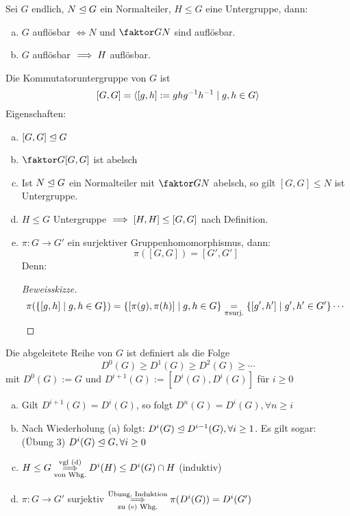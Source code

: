 \documentclass[a4paper]{report}
\begin{document}
\begin{prop}[übung]
  Sei $G$ endlich, $N \trianglelefteq G$ ein Normalteiler, $H \le G$ eine Untergruppe, dann:
  \begin{enumerate}[(a)]
    \item $G$ auflösbar $\iff N$ und $\fak GN$ sind auflösbar.
    \item $G$ auflösbar $\implies H$ auflösbar.
  \end{enumerate}
\begin{whg*}
  Die Kommutatoruntergruppe von $G$ ist
  \[[G,G] = \langle[g, h] := ghg^{-1}h^{-1}\mid g, h \in G\rangle\]
  Eigenschaften:
  \begin{enumerate} [(a)]
    \item $[G, G] \trianglelefteq G$
    \item $\fak G{[G,G]}$ ist abelsch
    \item Ist $N \trianglelefteq G$ ein Normalteiler mit $\fak GN$ abelsch, so gilt $[G, G] \le N$ ist Untergruppe.
    \item $H \le G$ Untergruppe $\implies [H, H] \le [G, G]$ nach Definition.
    \item $\pi : G \to G'$ ein surjektiver Gruppenhomomorphismus, dann: \[\pi([G, G]) = [G', G']\]
          Denn: \begin{proof}[Beweisskizze]
           \[\pi(\{[g, h] \mid g, h \in G\}) = \{[\pi(g), \pi(h)] \mid g, h \in G\} \underset{\pi \text{surj.}} = \{[g', h'] \mid g', h' \in G'\} \cdots \qedhere\]
          \end{proof}
  \end{enumerate}
\end{whg*}
\end{prop}
\begin{defi}
  Die abgeleitete Reihe von $G$ ist definiert als die Folge \[D^{0}(G) \ge D^{1}(G) \ge D^{2}(G) \ge \cdots\]
  mit $D^{0}(G) := G$ und $D^{i+1}(G) := [D^{i}(G), D^{i}(G)]$ für $i \ge 0$
\end{defi}
\begin{bem}\item
\begin{enumerate}[(a)]
  \item Gilt $D^{i+1}(G) = D^{i}(G)$, so folgt $D^{n}(G) = D^{i}(G), \forall n \ge i$
  \item Nach Wiederholung (a) folgt: $D^{i}(G) \trianglelefteq D^{i-1}(G), \forall i \ge 1$. Es gilt sogar: (Übung 3) $D^{i}(G) \trianglelefteq G, \forall i \ge 0$
  \item $H \le G \overunderset{\text{vgl (d)}}{\text{von Whg.}}\imp D^{i}(H) \le D^{i}(G) \cap H$ (induktiv)
    \item $\pi: G \to G'$ surjektiv $\overunderset{\text{Übung, Induktion}}{\text{zu (e) Whg.}} \imp  \pi(D^{i}(G)) = D^{i}(G')$
\end{enumerate}
\end{bem}
\end{document}
